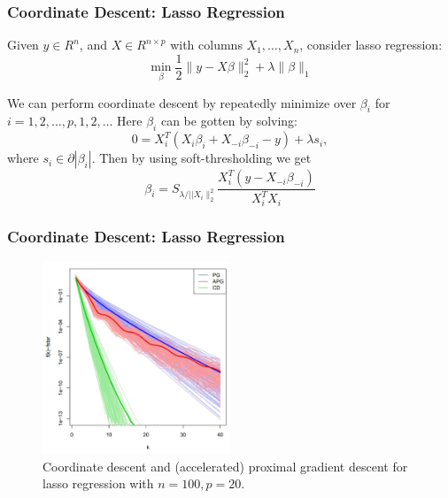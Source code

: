 \begin{frame}
\frametitle{Coordinate Descent: Lasso Regression}
Given $y \in R^n$, and $X \in R^{n \times p}$ with columns $X_1, \ldots, X_n$, consider lasso regression:
$$
\min _\beta \frac{1}{2}\|y-X \beta\|_2^2+\lambda\|\beta\|_1
$$

We can perform coordinate descent by repeatedly minimize over $\beta_i$ for $i=1,2, \ldots, p, 1,2, \ldots$ Here $\beta_i$ can be gotten by solving:
$$
0=X_i^T\left(X_i \beta_i+X_{-i} \beta_{-i}-y\right)+\lambda s_i,
$$
where $s_i \in \partial\left|\beta_i\right|$. Then by using soft-thresholding we get
$$
\beta_i=S_{\lambda /|| X_i \|_2^2} \frac{X_i^T\left(y-X_{-i} \beta_{-i}\right)}{X_i^T X_i}
$$
\end{frame}

\begin{frame}
    \frametitle{Coordinate Descent: Lasso Regression}
\begin{figure}[!htbp]
    \begin{center}
        \includegraphics[width=0.5\textwidth]{img/cd_lasso.png}
    \end{center}
    \caption{Coordinate descent and (accelerated) proximal gradient descent for lasso regression with $n=100,p=20$.}\label{fig:cd_lasso}
\end{figure}
\end{frame}